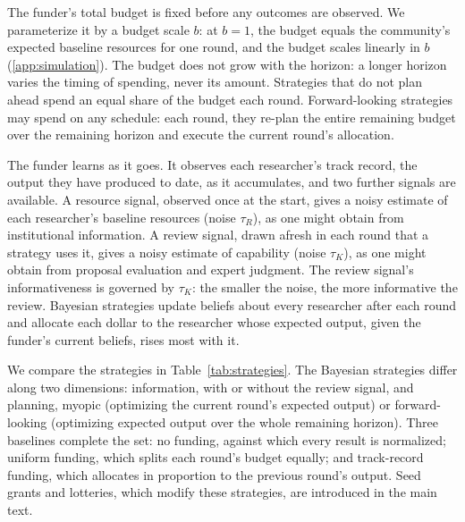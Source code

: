 The funder's total budget is fixed before any outcomes are observed. We parameterize it by a budget scale $b$: at $b = 1$, the budget equals the community's expected baseline resources for one round, and the budget scales linearly in $b$ (\ref{app:simulation}). The budget does not grow with the horizon: a longer horizon varies the timing of spending, never its amount. Strategies that do not plan ahead spend an equal share of the budget each round. Forward-looking strategies may spend on any schedule: each round, they re-plan the entire remaining budget over the remaining horizon and execute the current round's allocation.

The funder learns as it goes. It observes each researcher's track record, the output they have produced to date, as it accumulates, and two further signals are available. A resource signal, observed once at the start, gives a noisy estimate of each researcher's baseline resources (noise $\tau_R$), as one might obtain from institutional information. A review signal, drawn afresh in each round that a strategy uses it, gives a noisy estimate of capability (noise $\tau_K$), as one might obtain from proposal evaluation and expert judgment. The review signal's informativeness is governed by $\tau_K$: the smaller the noise, the more informative the review. Bayesian strategies update beliefs about every researcher after each round and allocate each dollar to the researcher whose expected output, given the funder's current beliefs, rises most with it.

We compare the strategies in Table~\ref{tab:strategies}. The Bayesian strategies differ along two dimensions: information, with or without the review signal, and planning, myopic (optimizing the current round's expected output) or forward-looking (optimizing expected output over the whole remaining horizon). Three baselines complete the set: no funding, against which every result is normalized; uniform funding, which splits each round's budget equally; and track-record funding, which allocates in proportion to the previous round's output. Seed grants and lotteries, which modify these strategies, are introduced in the main text.

